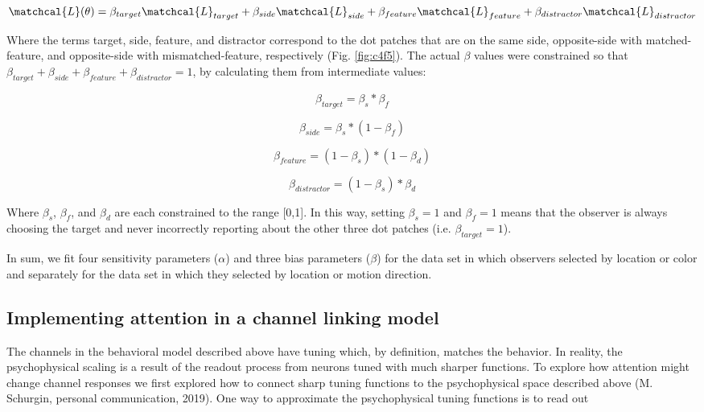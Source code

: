\begin{equation}
    \matchcal{L}(\theta) = \beta_{target}\matchcal{L}_{target} + \beta_{side}\matchcal{L}_{side} +\beta_{feature}\matchcal{L}_{feature} +\beta_{distractor}\matchcal{L}_{distractor}
\end{equation}

Where the terms target, side, feature, and distractor correspond to the dot patches that are on the same side, opposite-side with matched-feature, and opposite-side with mismatched-feature, respectively (Fig. \ref{fig:c4f5}). The actual $\beta$ values were constrained so that $\beta_{target}+\beta_{side}+\beta_{feature}+\beta_{distractor}=1$, by calculating them from intermediate values:

\begin{equation}
    \beta_{target} = \beta_{s} * \beta_{f}
\end{equation}

\begin{equation}
    \beta_{side} = \beta_{s} * (1-\beta_{f})
\end{equation}

\begin{equation}
    \beta_{feature} = (1-\beta_{s}) * (1-\beta_{d})
\end{equation}

\begin{equation}
    \beta_{distractor} = (1-\beta_{s}) * \beta_{d}
\end{equation}

Where $\beta_s$, $\beta_f$, and $\beta_d$ are each constrained to the range [0,1]. In this way, setting $\beta_s=1$ and $\beta_f=1$ means that the observer is always choosing the target and never incorrectly reporting about the other three dot patches (i.e. $\beta_{target}=1$).

In sum, we fit four sensitivity parameters ($\alpha$) and three bias parameters ($\beta$) for the data set in which observers selected by location or color and separately for the data set in which they selected by location or motion direction.

\subsection{Implementing attention in a channel linking model}

The channels in the behavioral model described above have tuning which, by definition, matches the behavior. In reality, the psychophysical scaling is a result of the readout process from neurons tuned with much sharper functions. To explore how attention might change channel responses we first explored how to connect sharp tuning functions to the psychophysical space described above (M. Schurgin, personal communication, 2019). One way to approximate the psychophysical tuning functions is to read out 


